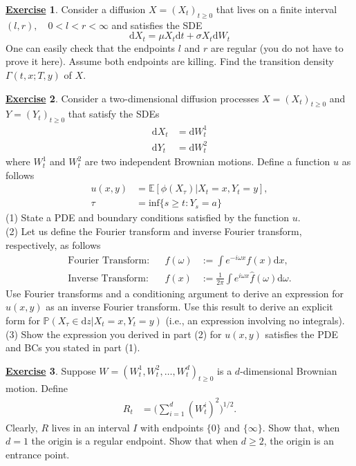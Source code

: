 \documentclass[12pt]{book}
\numberwithin{equation}{chapter}
\theoremstyle{plain}
\numberwithin{theorem}{section}
\theoremstyle{definition}
\newtheorem{exercise}{\underline{Exercise}}
\numberwithin{exercise}{chapter}
\newcommand{\<}{\langle}
\renewcommand{\>}{\rangle}
\renewcommand{\(}{\left(}
\renewcommand{\)}{\right)}
\renewcommand{\[}{\left[}
\renewcommand{\]}{\right]}
\newcommand\Eb{\mathds{E}}
\newcommand\Pb{\mathds{P}}
\newcommand\dd{\mathrm{d}}
\begin{document}
\begin{exercise}
\label{exer:9.5}
Consider a diffusion $X = (X_t)_{t\geq 0}$ that lives on a finite interval $(l,r), \quad  0< l < r < \infty $ and satisfies the SDE
$$\dd X_t =  \mu X_t \dd t + \sigma X_t \dd W_t $$
One can easily check that the endpoints $l$ and $r$ are regular (you do not have to prove it here). Assume both endpoints are killing. Find the transition density $\Gamma(t,x;T, y)$ of $X$.
\end{exercise}

\begin{exercise}
\label{exer:9.6}
Consider a two-dimensional diffusion processes $X=(X_t)_{t \geq 0}$ and $Y=(Y_t)_{t \geq 0}$ that satisfy the SDEs
\begin{align}
\dd X_t &= \dd W_t^1\\
\dd Y_t &= \dd W_t^2
\end{align}
where $W_t^1$ and $W_t^2$ are two independent Brownian motions.  Define a function $u$ as follows
\begin{align}
u(x,y) &= \Eb [\phi (X_\tau) | X_t = x, Y_t = y] ,\\
\tau &= \text{inf} \{s \geq t : Y_s = a\}
\end{align}
(1) State a PDE and boundary conditions satisfied by the function $u$.\\
(2) Let us define the Fourier transform and inverse Fourier transform, respectively, as follows
\begin{align}
\text{Fourier Transform}:&&
\widehat{f}(\omega) 
	&:= \int e^{- i \omega x} f(x) \dd x , \\
\text{Inverse Transform}:&&
f(x) 
	&:= \frac{1}{2 \pi} \int e^{i \omega x} \widehat{f}(\omega) \dd \omega. 
\end{align}
Use Fourier transforms and a conditioning argument to derive an expression for $u(x,y)$ as an inverse Fourier transform.  Use this result to derive an explicit form for $\Pb(X_\tau \in \dd z | X_t=x, Y_t= y)$ (i.e., an expression involving no integrals).\\
(3) Show the expression you derived in part (2) for $u(x,y)$ satisfies the PDE and BCs you stated in part (1).
\end{exercise}

\begin{exercise}
\label{exer:9.7}
Suppose $W = (W_t^1,W_t^2,\ldots,W_t^d)_{t \geq 0}$ is a $d$-dimensional Brownian motion.  Define
\begin{align}
R_t
	&=	\Big( \sum_{i=1}^d (W_t^i)^2 \Big)^{1/2} .
\end{align}
Clearly, $R$ lives in an interval $I$ with endpoints $\{0\}$ and $\{\infty\}$.  Show that, when $d=1$ the origin is a regular endpoint.  Show that when $d \geq 2$, the origin is an entrance point.
\end{exercise}
\end{document}
